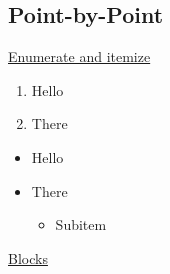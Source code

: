 \documentclass[11pt,aspectratio=43,xcolor={dvipsnames},hyperref={pdftex,pdfpagemode=UseNone,hidelinks,pdfdisplaydoctitle=true},usepdftitle=false]{ctexbeamer}
\begin{document}
\subsection{Point-by-Point}
\begin{frame}
  \subsectionpage
\end{frame}
\begin{frame}{\underline{Enumerate and itemize}}
  \begin{enumerate}
    \item Hello
    \item There
  \end{enumerate}
  \begin{itemize}
    \item Hello
    \item There
          \begin{itemize}
            \item Subitem
          \end{itemize}
  \end{itemize}
\end{frame}

\begin{frame}{\underline{Blocks}}
  \itshape\lipsum[3]
\end{frame}
\end{document}
